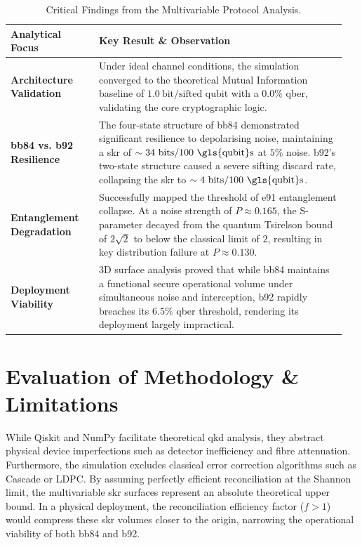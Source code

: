 \documentclass[11pt, a4paper]{report}
\renewcommand{\footnotesize}{\fontsize{9}{10}\selectfont}
\begin{document}
\begin{table}[htbp]
    \centering
    \caption{Critical Findings from the Multivariable Protocol Analysis.}
    \label{tab:key_findings}
    \footnotesize
    \renewcommand{\arraystretch}{1.4} %
    \begin{tabular}{@{}p{0.25\linewidth} p{0.7\linewidth}@{}}
        \toprule
        \textbf{Analytical Focus} & \textbf{Key Result \& Observation} \\
        \midrule
        \textbf{Architecture Validation} & Under ideal channel conditions, the simulation converged to the theoretical Mutual Information baseline of \( 1.0\ \text{bit/sifted qubit} \) with a \( 0.0\% \) \gls{qber}, validating the core cryptographic logic. \\
        
        \textbf{\gls{bb84} vs. \gls{b92} Resilience} & The four-state structure of \gls{bb84} demonstrated significant resilience to depolarising noise, maintaining a \gls{skr} of \( \sim34\ \text{bits/100 \gls{qubit}s} \) at \( 5\% \) noise. \gls{b92}'s two-state structure caused a severe sifting discard rate, collapsing the \gls{skr} to \( \sim4\ \text{bits/100 \gls{qubit}s} \). \\
        
        \textbf{Entanglement Degradation} & Successfully mapped the threshold of \gls{e91} \gls{entanglement} collapse. At a noise strength of \( P \approx 0.165 \), the S-parameter decayed from the quantum Tsirelson bound of \( 2\sqrt{2} \) to below the classical limit of \( 2 \), resulting in key distribution failure at \( P \approx 0.130 \). \\
        
        \textbf{Deployment Viability} & 3D surface analysis proved that while \gls{bb84} maintains a functional secure operational volume under simultaneous noise and interception, \gls{b92} rapidly breaches its \( 6.5\% \) \gls{qber} threshold, rendering its deployment largely impractical. \\
        \bottomrule
    \end{tabular}
\end{table}

\newpage
\section{Evaluation of Methodology \& Limitations}
\label{sec:eval}

While Qiskit and NumPy facilitate theoretical \gls{qkd} analysis, they abstract physical device imperfections such as detector inefficiency and fibre attenuation. Furthermore, the simulation excludes classical error correction algorithms such as Cascade \cite{Cascade1994} or LDPC. By assuming perfectly efficient reconciliation at the Shannon limit, the multivariable \gls{skr} surfaces represent an absolute theoretical upper bound. In a physical deployment, the reconciliation efficiency factor (\(f > 1\)) would compress these \gls{skr} volumes closer to the origin, narrowing the operational viability of both \gls{bb84} and \gls{b92}.
\end{document}
